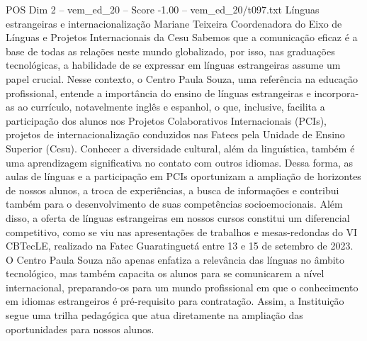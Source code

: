\begin{textsample}{POS Dim 2 – vem\_ed\_20 – Score -1.00 – vem\_ed\_20/t097.txt}  \label{ex:f2_pos_066}
Línguas estrangeiras e internacionalização Mariane Teixeira Coordenadora do Eixo de Línguas e Projetos Internacionais da Cesu Sabemos que a comunicação eficaz é a base de todas as relações neste mundo globalizado, por isso, nas graduações tecnológicas, a habilidade de se expressar em línguas estrangeiras assume um papel crucial.
Nesse contexto, o Centro Paula Souza, uma referência na educação profissional, entende a importância do ensino de línguas estrangeiras e incorpora-as ao currículo, notavelmente inglês e espanhol, o que, inclusive, facilita a participação dos alunos nos Projetos Colaborativos Internacionais (PCIs), projetos de internacionalização conduzidos nas Fatecs pela Unidade de Ensino Superior (Cesu).
Conhecer a diversidade cultural, além da linguística, também é uma aprendizagem significativa no contato com outros idiomas.
Dessa forma, as aulas de línguas e a participação em PCIs oportunizam a ampliação de horizontes de nossos alunos, a troca de experiências, a busca de informações e contribui também para o desenvolvimento de suas competências socioemocionais.
Além disso, a oferta de línguas estrangeiras em nossos cursos constitui um diferencial competitivo, como se viu nas apresentações de trabalhos e mesas-redondas do VI CBTecLE, realizado na Fatec Guaratinguetá entre 13 e 15 de setembro de 2023.
O Centro Paula Souza não apenas enfatiza a relevância das línguas no âmbito tecnológico, mas também capacita os alunos para se comunicarem a nível internacional, preparando-os para um mundo profissional em que o conhecimento em idiomas estrangeiros é pré-requisito para contratação.
Assim, a Instituição segue uma trilha pedagógica que atua diretamente na ampliação das oportunidades para nossos alunos.

\end{textsample}
